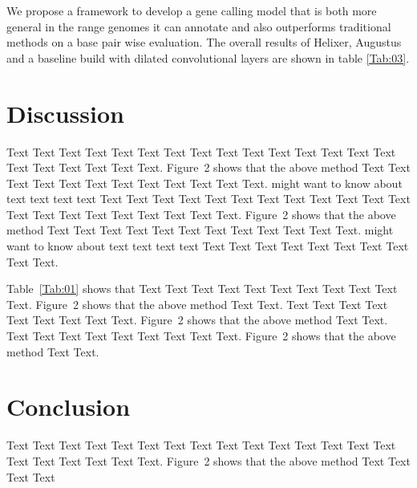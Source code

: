 \documentclass{bioinfo}
\begin{document}
We propose a framework to develop a gene calling model that is both more general in the range genomes it can annotate and also outperforms traditional methods on a base pair wise evaluation. The overall results of Helixer, Augustus and a baseline build with dilated convolutional layers are shown in table \ref{Tab:03}.


\section{Discussion}

Text Text Text Text Text Text  Text Text Text Text Text Text Text
Text Text  Text Text Text Text Text Text.
Figure~2\vphantom{\ref{fig:02}} shows that the above method  Text
Text Text Text  Text Text Text Text Text Text  Text Text.
\citealp{Boffelli03} might want to know about  text text text text
Text Text Text Text Text Text  Text Text Text Text Text Text Text
Text Text  Text Text Text Text Text Text.
Figure~2\vphantom{\ref{fig:02}} shows that the above method  Text
Text Text Text  Text Text Text Text Text Text  Text Text.
\citealp{Boffelli03} might want to know about  text text text text
Text Text Text Text Text Text Text Text Text Text.




Table~\ref{Tab:01} shows that Text Text Text Text Text  Text Text
Text Text Text Text. Figure~2\vphantom{\ref{fig:02}} shows that
the above method Text Text. Text Text Text  Text Text Text Text
Text Text. Figure~2\vphantom{\ref{fig:02}} shows that the above
method Text Text. Text Text Text  Text Text Text Text Text Text.
Figure~2\vphantom{\ref{fig:02}} shows that the above method Text
Text.









%
%






\section{Conclusion}

Text Text Text Text Text Text  Text Text Text Text Text Text Text
Text Text  Text Text Text Text Text Text.
Figure~2\vphantom{\ref{fig:02}} shows that the above method  Text
Text Text Text\vspace*{-10pt}
\end{document}
